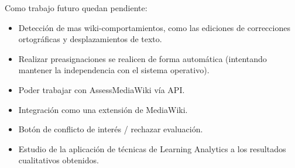 Como trabajo futuro quedan pendiente:
\begin{itemize}
	\item Detección de mas wiki-comportamientos, como las ediciones de correcciones ortográficas y desplazamientos de texto.
	\item Realizar preasignaciones se realicen de forma automática (intentando mantener la independencia con el sistema operativo).
	\item Poder trabajar con AssessMediaWiki vía API.
	\item Integración como una extensión de MediaWiki.
	\item Botón de conflicto de interés / rechazar evaluación.
	\item Estudio de la aplicación de técnicas de Learning Analytics a los resultados cualitativos obtenidos. \cite{Conde} 
\end{itemize}